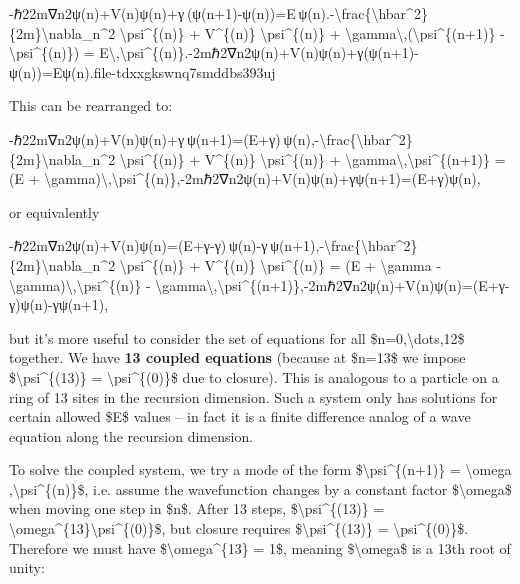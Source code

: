 \documentclass[
]{article}
\begin{document}
-ℏ22m∇n2ψ(n)+V(n)ψ(n)+γ (ψ(n+1)-ψ(n))=E ψ(n).-\textbackslash frac\{\textbackslash hbar\^{}2\}\{2m\}\textbackslash nabla\_n\^{}2
\textbackslash psi\^{}\{(n)\} + V\^{}\{(n)\}
\textbackslash psi\^{}\{(n)\} +
\textbackslash gamma\textbackslash,(\textbackslash psi\^{}\{(n+1)\} -
\textbackslash psi\^{}\{(n)\}) =
E\textbackslash,\textbackslash psi\^{}\{(n)\}.-2mℏ2\hspace{0pt}∇n2\hspace{0pt}ψ(n)+V(n)ψ(n)+γ(ψ(n+1)-ψ(n))=Eψ(n).\hspace{0pt}file-tdxxgkswnq7smddbs393uj\hspace{0pt}

This can be rearranged to:

-ℏ22m∇n2ψ(n)+V(n)ψ(n)+γ ψ(n+1)=(E+γ) ψ(n),-\textbackslash frac\{\textbackslash hbar\^{}2\}\{2m\}\textbackslash nabla\_n\^{}2
\textbackslash psi\^{}\{(n)\} + V\^{}\{(n)\}
\textbackslash psi\^{}\{(n)\} +
\textbackslash gamma\textbackslash,\textbackslash psi\^{}\{(n+1)\} = (E
+
\textbackslash gamma)\textbackslash,\textbackslash psi\^{}\{(n)\},-2mℏ2\hspace{0pt}∇n2\hspace{0pt}ψ(n)+V(n)ψ(n)+γψ(n+1)=(E+γ)ψ(n),

or equivalently

-ℏ22m∇n2ψ(n)+V(n)ψ(n)=(E+γ-γ) ψ(n)-γ ψ(n+1),-\textbackslash frac\{\textbackslash hbar\^{}2\}\{2m\}\textbackslash nabla\_n\^{}2
\textbackslash psi\^{}\{(n)\} + V\^{}\{(n)\}
\textbackslash psi\^{}\{(n)\} = (E + \textbackslash gamma -
\textbackslash gamma)\textbackslash,\textbackslash psi\^{}\{(n)\} -
\textbackslash gamma\textbackslash,\textbackslash psi\^{}\{(n+1)\},-2mℏ2\hspace{0pt}∇n2\hspace{0pt}ψ(n)+V(n)ψ(n)=(E+γ-γ)ψ(n)-γψ(n+1),

but it's more useful to consider the set of equations for all
\$n=0,\textbackslash dots,12\$ together. We have \textbf{13 coupled
equations} (because at \$n=13\$ we impose
\$\textbackslash psi\^{}\{(13)\} = \textbackslash psi\^{}\{(0)\}\$ due
to closure)\hspace{0pt}. This is analogous to a particle on a ring of 13
sites in the recursion dimension. Such a system only has solutions for
certain allowed \$E\$ values -- in fact it is a finite difference analog
of a wave equation along the recursion dimension.

To solve the coupled system, we try a mode of the form
\$\textbackslash psi\^{}\{(n+1)\} = \textbackslash omega
,\textbackslash psi\^{}\{(n)\}\$, i.e. assume the wavefunction changes
by a constant factor \$\textbackslash omega\$ when moving one step in
\$n\$\hspace{0pt}. After 13 steps, \$\textbackslash psi\^{}\{(13)\} =
\textbackslash omega\^{}\{13\}\textbackslash psi\^{}\{(0)\}\$, but
closure requires \$\textbackslash psi\^{}\{(13)\} =
\textbackslash psi\^{}\{(0)\}\$. Therefore we must have
\$\textbackslash omega\^{}\{13\} = 1\$, meaning \$\textbackslash omega\$
is a 13th root of unity:
\end{document}

